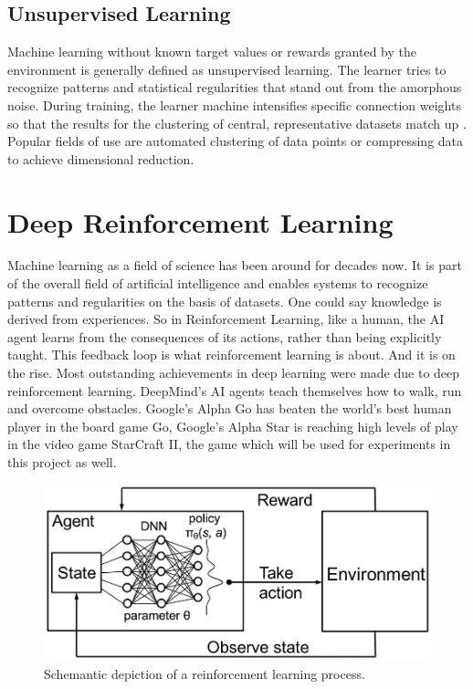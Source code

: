 \documentclass[12pt,a4paper]{article}
\begin{document}
\subsection{Unsupervised Learning}
Machine learning without known target values or rewards granted by the environment is generally defined as unsupervised learning. The learner tries to recognize patterns and statistical regularities that stand out from the amorphous noise. During training, the learner machine intensifies specific connection weights so that the results for the clustering of central, representative datasets match up \cite{Patterson1997}. Popular fields of use are automated clustering of data points or compressing data to achieve dimensional reduction.
\section{Deep Reinforcement Learning}
Machine learning as a field of science has been around for decades now. It is part of the overall field of artificial intelligence and enables systems to recognize patterns and regularities on the basis of datasets.
One could say knowledge is derived from experiences. So in Reinforcement Learning, like a human, the AI agent learns from the consequences of its actions, rather than being explicitly taught. This feedback loop is what reinforcement learning is about.
And it is on the rise. Most outstanding achievements in deep learning were made due to deep reinforcement learning. DeepMind's AI agents teach themselves how to walk, run and overcome obstacles.
Google's Alpha Go has beaten the world's best human player in the board game Go, Google's Alpha Star is reaching high levels of play in the
video game StarCraft II, the game which will be used for experiments in this project as well.
\newline
\begin{figure}
    \centering
    \includegraphics[width={0.5\linewidth}]{Figures/DRL_schemantic_depiction.jpeg}
    \caption{Schemantic depiction of a reinforcement learning process.}
    \label{fig:drl_schemantic}
\end{figure}
\end{document}
